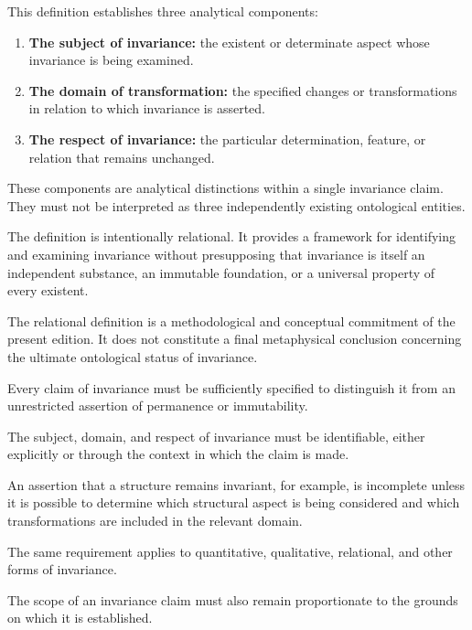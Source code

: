 This definition establishes three analytical
components:

\begin{enumerate}
    \item \textbf{The subject of invariance:}
    the existent or determinate aspect whose
    invariance is being examined.

    \item \textbf{The domain of transformation:}
    the specified changes or transformations
    in relation to which invariance is asserted.

    \item \textbf{The respect of invariance:}
    the particular determination, feature,
    or relation that remains unchanged.
\end{enumerate}

These components are analytical distinctions
within a single invariance claim. They must
not be interpreted as three independently
existing ontological entities.

The definition is intentionally relational.
It provides a framework for identifying and
examining invariance without presupposing
that invariance is itself an independent
substance, an immutable foundation, or
a universal property of every existent.

The relational definition is a methodological
and conceptual commitment of the present
edition. It does not constitute a final
metaphysical conclusion concerning the
ultimate ontological status of invariance.


Every claim of invariance must be sufficiently
specified to distinguish it from an unrestricted
assertion of permanence or immutability.

The subject, domain, and respect of invariance
must be identifiable, either explicitly or
through the context in which the claim is made.

An assertion that a structure remains invariant,
for example, is incomplete unless it is possible
to determine which structural aspect is being
considered and which transformations are
included in the relevant domain.

The same requirement applies to quantitative,
qualitative, relational, and other forms of
invariance.

The scope of an invariance claim must also
remain proportionate to the grounds on which
it is established.

